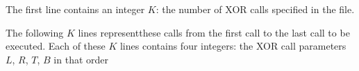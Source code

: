 The first line contains an integer $K$: the number of XOR calls specified in the file. 

The following $K$ lines representthese calls from the first call to the last call to be executed. Each of these $K$ lines contains four integers: the XOR call parameters $L$, $R$, $T$, $B$ in that order